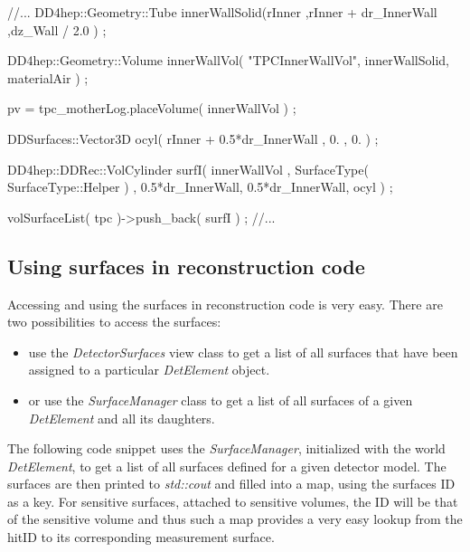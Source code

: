 \documentclass[10pt,a4paper]{article}
\begin{document}
\begin{code}
  //...
  DD4hep::Geometry::Tube innerWallSolid(rInner ,rInner + dr_InnerWall ,dz_Wall / 2.0 ) ;

  DD4hep::Geometry::Volume innerWallVol( "TPCInnerWallVol", innerWallSolid, materialAir ) ; 

  pv = tpc_motherLog.placeVolume( innerWallVol ) ;

  DDSurfaces::Vector3D ocyl(  rInner + 0.5*dr_InnerWall , 0. , 0. ) ;

  DD4hep::DDRec::VolCylinder surfI( innerWallVol , 
                                    SurfaceType( SurfaceType::Helper ) ,
                                    0.5*dr_InnerWall, 0.5*dr_InnerWall, 
                                    ocyl ) ;

  volSurfaceList( tpc )->push_back(  surfI ) ;
  //...
\end{code}




\subsection{Using surfaces in reconstruction code}
\label{subsec:ddrec-surfaces-reconstruction}
Accessing and using the surfaces in reconstruction code is very easy. 
There are two possibilities to access the surfaces:
\begin{itemize}
\item use the {\em DetectorSurfaces} view class to get a list of 
 all surfaces that have been assigned to a particular {\em DetElement}
 object.
\item or use the {\em SurfaceManager} class to get a list of all
 surfaces of a given {\em DetElement} and all its daughters.
\end{itemize}

\noindent
The following code snippet uses the {\em SurfaceManager}, initialized
with the world  {\em DetElement}, to get a list of all surfaces 
defined for a given detector model.
The surfaces are then printed to {\em std::cout} and filled 
into a map, using the surfaces ID as a key.
For sensitive surfaces, attached to sensitive volumes, the ID
will be that of the sensitive volume and thus such a map provides
a very easy lookup from the hitID to its corresponding measurement
surface.
\end{document}

